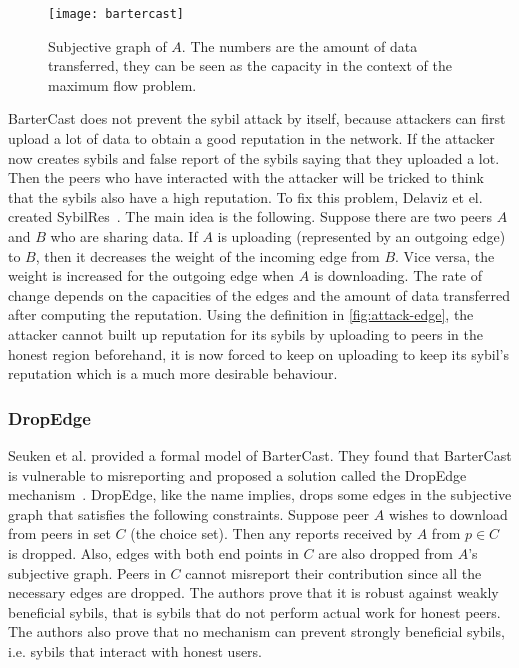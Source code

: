 \begin{figure}
  \centering
  \texttt{[image: bartercast]}
  \caption{Subjective graph of $A$. The numbers are the amount of data transferred,
    they can be seen as the capacity in the context of the maximum flow
    problem.}
  \label{fig:bartercast}
\end{figure}

BarterCast does not prevent the sybil attack by itself, because attackers can
first upload a lot of data to obtain a good reputation in the network. If the
attacker now creates sybils and false report of the sybils saying that they
uploaded a lot. Then the peers who have interacted with the attacker will be
tricked to think that the sybils also have a high reputation. To fix this
problem, Delaviz et el. created SybilRes~\cite{delaviz2012sybilres}.
The main idea is the following. Suppose there are two peers $A$ and $B$ who are
sharing data. If $A$ is uploading (represented by an outgoing edge) to $B$, then
it decreases the weight of the incoming edge from $B$. Vice versa, the weight is
increased for the outgoing edge when $A$ is downloading. The rate of change
depends on the capacities of the edges and the amount of data transferred after
computing the reputation. Using the definition in \autoref{fig:attack-edge}, the
attacker cannot built up reputation for its sybils by uploading to peers in the
honest region beforehand, it is now forced to keep on uploading to keep its
sybil's reputation which is a much more desirable behaviour.

\subsubsection{DropEdge}
Seuken et al. provided a formal model of BarterCast. They found that BarterCast
is vulnerable to misreporting and proposed a solution called the DropEdge
mechanism~\cite{seuken2011sybil, seuken2014sybil}. DropEdge, like the name
implies, drops some edges in the subjective graph that satisfies the following
constraints. Suppose peer $A$ wishes to download from peers in set $C$ (the
choice set). Then any reports received by $A$ from $p \in C$ is dropped. Also,
edges with both end points in $C$ are also dropped from $A$'s subjective graph.
Peers in $C$ cannot misreport their contribution since all the necessary edges
are dropped. The authors prove that it is robust against weakly beneficial
sybils, that is sybils that do not perform actual work for honest peers. The
authors also prove that no mechanism can prevent strongly beneficial sybils,
i.e. sybils that interact with honest users.

